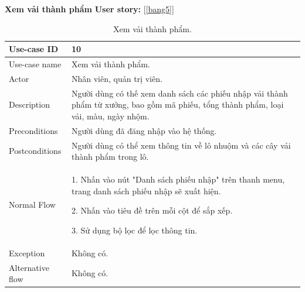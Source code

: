 \textbf{Xem vải thành phẩm}
\textbf{User story:} [\ref{bang5}]
\begin{table}[!htp]
    \centering
    \begin{tabular}{|m{3cm}|m{10cm}|}
    \hline 
        Use-case ID & 10\\ \hline
        Use-case name & Xem vải thành phẩm.\\ \hline
        Actor & Nhân viên, quản trị viên.\\ \hline
        Description & Người dùng có thế xem danh sách các phiếu nhập vải thành phẩm từ xưởng, bao gồm mã phiếu, tổng thành phẩm, loại vải, màu, ngày nhộm.\\ \hline
        Preconditions & Người dùng đã đăng nhập vào hệ thống.\\ \hline
        Postconditions & Người dùng có thể xem thông tin về lô nhuộm và các cây vải thành phẩm trong lô.\\ \hline
        Normal Flow & 
        1. Nhấn vào nút "Danh sách phiếu nhập" trên thanh menu, trang danh sách phiếu nhập sẽ xuất hiện.\par
        2. Nhấn vào tiêu đề trên mỗi cột để sắp xếp.\par
        3. Sử dụng bộ lọc để lọc thông tin.
        \\ \hline
        Exception & Không có.\\ \hline
        Alternative flow & Không có.\\ 
    \hline 
    \end{tabular}
    \caption{Xem vải thành phẩm.}
    \label{bang10}
\end{table}

